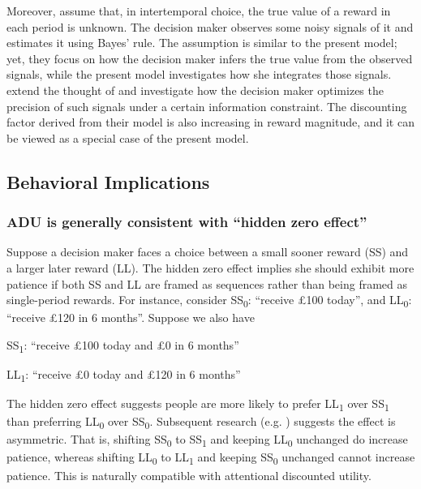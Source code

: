 \documentclass[
  12pt,
]{article}
\begin{document}
Moreover, \citet{gabaix_myopia_2017} assume that, in intertemporal
choice, the true value of a reward in each period is unknown. The
decision maker observes some noisy signals of it and estimates it using
Bayes' rule. The assumption is similar to the present model; yet, they
focus on how the decision maker infers the true value from the observed
signals, while the present model investigates how she integrates those
signals. \citet{gershman_rationally_2020} extend the thought of
\citet{gabaix_myopia_2017} and investigate how the decision maker
optimizes the precision of such signals under a certain information
constraint. The discounting factor derived from their model is also
increasing in reward magnitude, and it can be viewed as a special case
of the present model.

\hypertarget{behavioral-implications}{%
\subsection{Behavioral Implications}\label{behavioral-implications}}

\hypertarget{adu-is-generally-consistent-with-hidden-zero-effect}{%
\subsubsection{ADU is generally consistent with ``hidden zero
effect''}\label{adu-is-generally-consistent-with-hidden-zero-effect}}

Suppose a decision maker faces a choice between a small sooner reward
(SS) and a larger later reward (LL). The hidden zero effect
\citep{magen_hidden-zero_2008} implies she should exhibit more patience
if both SS and LL are framed as sequences rather than being framed as
single-period rewards. For instance, consider SS\textsubscript{0}:
``receive £100 today'', and LL\textsubscript{0}: ``receive £120 in 6
months''. Suppose we also have

\setlength{\leftskip}{1cm}

SS\textsubscript{1}: ``receive £100 today and £0 in 6 months''

LL\textsubscript{1}: ``receive £0 today and £120 in 6 months''

\setlength{\leftskip}{0pt}

The hidden zero effect suggests people are more likely to prefer
LL\textsubscript{1} over SS\textsubscript{1} than preferring
LL\textsubscript{0} over SS\textsubscript{0}. Subsequent research (e.g.
\citet{read_value_2017}) suggests the effect is asymmetric. That is,
shifting SS\textsubscript{0} to SS\textsubscript{1} and keeping
LL\textsubscript{0} unchanged do increase patience, whereas shifting
LL\textsubscript{0} to LL\textsubscript{1} and keeping
SS\textsubscript{0} unchanged cannot increase patience. This is
naturally compatible with attentional discounted utility.
\end{document}
